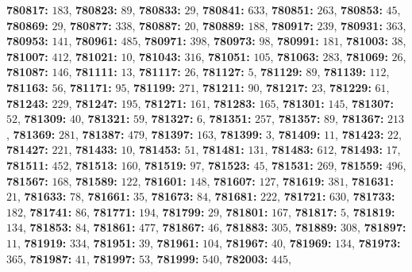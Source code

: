 \textsf{\bfseries 780817:} $183$, \textsf{\bfseries 780823:} $89$, \textsf{\bfseries 780833:} $29$, \textsf{\bfseries 780841:} $633$, \textsf{\bfseries 780851:} $263$, \textsf{\bfseries 780853:} $45$, \textsf{\bfseries 780869:} $29$, \textsf{\bfseries 780877:} $338$, \textsf{\bfseries 780887:} $20$, \textsf{\bfseries 780889:} $188$, \textsf{\bfseries 780917:} $239$, \textsf{\bfseries 780931:} $363$, \textsf{\bfseries 780953:} $141$, \textsf{\bfseries 780961:} $485$, \textsf{\bfseries 780971:} $398$, \textsf{\bfseries 780973:} $98$, \textsf{\bfseries 780991:} $181$, \textsf{\bfseries 781003:} $38$, \textsf{\bfseries 781007:} $412$, \textsf{\bfseries 781021:} $10$, \textsf{\bfseries 781043:} $316$, \textsf{\bfseries 781051:} $105$, \textsf{\bfseries 781063:} $283$, \textsf{\bfseries 781069:} $26$, \textsf{\bfseries 781087:} $146$, \textsf{\bfseries 781111:} $13$, \textsf{\bfseries 781117:} $26$, \textsf{\bfseries 781127:} $5$, \textsf{\bfseries 781129:} $89$, \textsf{\bfseries 781139:} $112$, \textsf{\bfseries 781163:} $56$, \textsf{\bfseries 781171:} $95$, \textsf{\bfseries 781199:} $271$, \textsf{\bfseries 781211:} $90$, \textsf{\bfseries 781217:} $23$, \textsf{\bfseries 781229:} $61$, \textsf{\bfseries 781243:} $229$, \textsf{\bfseries 781247:} $195$, \textsf{\bfseries 781271:} $161$, \textsf{\bfseries 781283:} $165$, \textsf{\bfseries 781301:} $145$, \textsf{\bfseries 781307:} $52$, \textsf{\bfseries 781309:} $40$, \textsf{\bfseries 781321:} $59$, \textsf{\bfseries 781327:} $6$, \textsf{\bfseries 781351:} $257$, \textsf{\bfseries 781357:} $89$, \textsf{\bfseries 781367:} $213$, \textsf{\bfseries 781369:} $281$, \textsf{\bfseries 781387:} $479$, \textsf{\bfseries 781397:} $163$, \textsf{\bfseries 781399:} $3$, \textsf{\bfseries 781409:} $11$, \textsf{\bfseries 781423:} $22$, \textsf{\bfseries 781427:} $221$, \textsf{\bfseries 781433:} $10$, \textsf{\bfseries 781453:} $51$, \textsf{\bfseries 781481:} $131$, \textsf{\bfseries 781483:} $612$, \textsf{\bfseries 781493:} $17$, \textsf{\bfseries 781511:} $452$, \textsf{\bfseries 781513:} $160$, \textsf{\bfseries 781519:} $97$, \textsf{\bfseries 781523:} $45$, \textsf{\bfseries 781531:} $269$, \textsf{\bfseries 781559:} $496$, \textsf{\bfseries 781567:} $168$, \textsf{\bfseries 781589:} $122$, \textsf{\bfseries 781601:} $148$, \textsf{\bfseries 781607:} $127$, \textsf{\bfseries 781619:} $381$, \textsf{\bfseries 781631:} $21$, \textsf{\bfseries 781633:} $78$, \textsf{\bfseries 781661:} $35$, \textsf{\bfseries 781673:} $84$, \textsf{\bfseries 781681:} $222$, \textsf{\bfseries 781721:} $630$, \textsf{\bfseries 781733:} $182$, \textsf{\bfseries 781741:} $86$, \textsf{\bfseries 781771:} $194$, \textsf{\bfseries 781799:} $29$, \textsf{\bfseries 781801:} $167$, \textsf{\bfseries 781817:} $5$, \textsf{\bfseries 781819:} $134$, \textsf{\bfseries 781853:} $84$, \textsf{\bfseries 781861:} $477$, \textsf{\bfseries 781867:} $46$, \textsf{\bfseries 781883:} $305$, \textsf{\bfseries 781889:} $308$, \textsf{\bfseries 781897:} $11$, \textsf{\bfseries 781919:} $334$, \textsf{\bfseries 781951:} $39$, \textsf{\bfseries 781961:} $104$, \textsf{\bfseries 781967:} $40$, \textsf{\bfseries 781969:} $134$, \textsf{\bfseries 781973:} $365$, \textsf{\bfseries 781987:} $41$, \textsf{\bfseries 781997:} $53$, \textsf{\bfseries 781999:} $540$, \textsf{\bfseries 782003:} $445$, 
